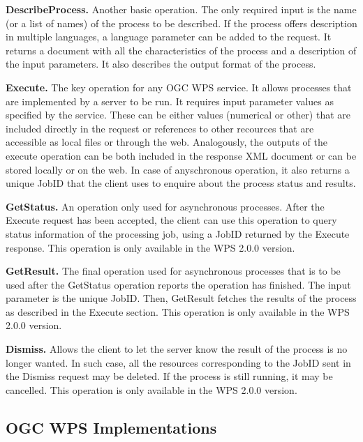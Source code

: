 \noindent \textbf{DescribeProcess.} Another basic operation. The only required input is the name (or a list of names) of the process to be described. If the process offers description in multiple languages, a language parameter can be added to the request. It returns a document with all the characteristics of the process and a description of the input parameters. It also describes the output format of the process.

\noindent \textbf{Execute.} The key operation for any OGC WPS service. It allows processes that are implemented by a server to be run. It requires input parameter values as specified by the service. These can be either values (numerical or other) that are included directly in the request or references to other recources that are accessible as local files or through the web. Analogously, the outputs of the execute operation can be both included in the response XML document or can be stored locally or on the web. In case of anyschronous operation, it also returns a unique JobID that the client uses to enquire about the process status and results.

\noindent \textbf{GetStatus.} An operation only used for asynchronous processes. After the Execute request has been accepted, the client can use this operation to query status information of the processing job, using a JobID returned by the Execute response. This operation is only available in the WPS 2.0.0 version.

\noindent \textbf{GetResult.} The final operation used for asynchronous processes that is to be used after the GetStatus operation reports the operation has finished. The input parameter is the unique JobID. Then, GetResult fetches the results of the process as described in the Execute section. This operation is only available in the WPS 2.0.0 version.

\noindent \textbf{Dismiss.} Allows the client to let the server know the result of the process is no longer wanted. In such case, all the resources corresponding to the JobID sent in the Dismiss request may be deleted. If the process is still running, it may be cancelled. This operation is only available in the WPS 2.0.0 version.

\subsection{OGC WPS Implementations}



